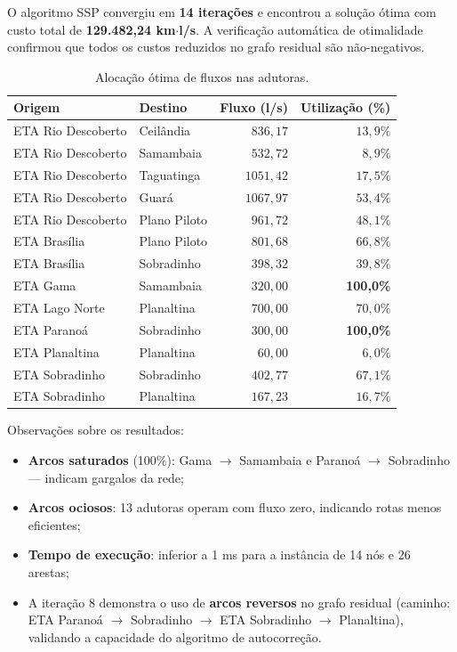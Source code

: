 O algoritmo SSP convergiu em \textbf{14 iterações} e encontrou a solução ótima com custo total de \textbf{129.482,24 km$\cdot$l/s}. A verificação automática de otimalidade confirmou que todos os custos reduzidos no grafo residual são não-negativos. 

\begin{table}[H]
  \centering
  \small
  \begin{tabular}{llrr}
    \toprule
    \textbf{Origem} & \textbf{Destino} & \textbf{Fluxo (l/s)} & \textbf{Utilização (\%)} \\
    \midrule
    ETA Rio Descoberto & Ceilândia & $836{,}17$ & $13{,}9\%$ \\
    ETA Rio Descoberto & Samambaia & $532{,}72$ & $8{,}9\%$ \\
    ETA Rio Descoberto & Taguatinga & $1051{,}42$ & $17{,}5\%$ \\
    ETA Rio Descoberto & Guará & $1067{,}97$ & $53{,}4\%$ \\
    ETA Rio Descoberto & Plano Piloto & $961{,}72$ & $48{,}1\%$ \\
    ETA Brasília & Plano Piloto & $801{,}68$ & $66{,}8\%$ \\
    ETA Brasília & Sobradinho & $398{,}32$ & $39{,}8\%$ \\
    ETA Gama & Samambaia & $320{,}00$ & \textbf{100{,}0\%} \\
    ETA Lago Norte & Planaltina & $700{,}00$ & $70{,}0\%$ \\
    ETA Paranoá & Sobradinho & $300{,}00$ & \textbf{100{,}0\%} \\
    ETA Planaltina & Planaltina & $60{,}00$ & $6{,}0\%$ \\
    ETA Sobradinho & Sobradinho & $402{,}77$ & $67{,}1\%$ \\
    ETA Sobradinho & Planaltina & $167{,}23$ & $16{,}7\%$ \\
    \bottomrule
  \end{tabular}
  \caption{Alocação ótima de fluxos nas adutoras.}
\end{table}

Observações sobre os resultados:

\begin{itemize}
  \item \textbf{Arcos saturados} (100\%): Gama $\rightarrow$ Samambaia e Paranoá $\rightarrow$ Sobradinho --- indicam gargalos da rede;
  \item \textbf{Arcos ociosos}: 13 adutoras operam com fluxo zero, indicando rotas menos eficientes;
  \item \textbf{Tempo de execução}: inferior a 1 ms para a instância de 14 nós e 26 arestas;
  \item A iteração 8 demonstra o uso de \textbf{arcos reversos} no grafo residual (caminho: ETA Paranoá $\rightarrow$ Sobradinho $\rightarrow$ ETA Sobradinho $\rightarrow$ Planaltina), validando a capacidade do algoritmo de autocorreção.
\end{itemize}
